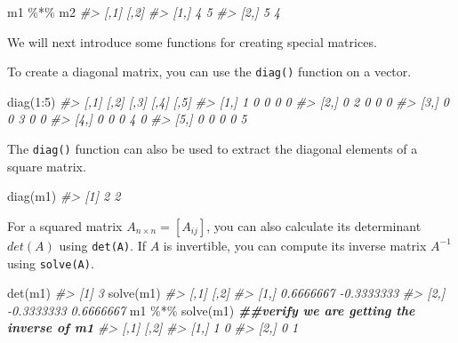 \documentclass[
]{book}
\newenvironment{Shaded}{\begin{snugshade}}{\end{snugshade}}
\newcommand{\CommentTok}[1]{\textcolor[rgb]{0.56,0.35,0.01}{\textit{#1}}}
\newcommand{\DecValTok}[1]{\textcolor[rgb]{0.00,0.00,0.81}{#1}}
\newcommand{\DocumentationTok}[1]{\textcolor[rgb]{0.56,0.35,0.01}{\textbf{\textit{#1}}}}
\newcommand{\FunctionTok}[1]{\textcolor[rgb]{0.00,0.00,0.00}{#1}}
\newcommand{\NormalTok}[1]{#1}
\newcommand{\SpecialCharTok}[1]{\textcolor[rgb]{0.00,0.00,0.00}{#1}}
\begin{document}
\begin{Shaded}
\begin{Highlighting}[]
\NormalTok{m1 }\SpecialCharTok{\%*\%}\NormalTok{ m2}
\CommentTok{\#\textgreater{}      [,1] [,2]}
\CommentTok{\#\textgreater{} [1,]    4    5}
\CommentTok{\#\textgreater{} [2,]    5    4}
\end{Highlighting}
\end{Shaded}

We will next introduce some functions for creating special matrices.

To create a diagonal matrix, you can use the \texttt{diag()} function on a vector.

\begin{Shaded}
\begin{Highlighting}[]
\FunctionTok{diag}\NormalTok{(}\DecValTok{1}\SpecialCharTok{:}\DecValTok{5}\NormalTok{)}
\CommentTok{\#\textgreater{}      [,1] [,2] [,3] [,4] [,5]}
\CommentTok{\#\textgreater{} [1,]    1    0    0    0    0}
\CommentTok{\#\textgreater{} [2,]    0    2    0    0    0}
\CommentTok{\#\textgreater{} [3,]    0    0    3    0    0}
\CommentTok{\#\textgreater{} [4,]    0    0    0    4    0}
\CommentTok{\#\textgreater{} [5,]    0    0    0    0    5}
\end{Highlighting}
\end{Shaded}

The \texttt{diag()} function can also be used to extract the diagonal elements of a square matrix.

\begin{Shaded}
\begin{Highlighting}[]
\FunctionTok{diag}\NormalTok{(m1)}
\CommentTok{\#\textgreater{} [1] 2 2}
\end{Highlighting}
\end{Shaded}

For a squared matrix \(A_{n\times n} = [A_{ij}]\), you can also calculate its determinant \(det(A)\) using \texttt{det(A)}. If \(A\) is invertible, you can compute its inverse matrix \(A^{-1}\) using \texttt{solve(A)}.

\begin{Shaded}
\begin{Highlighting}[]
\FunctionTok{det}\NormalTok{(m1)}
\CommentTok{\#\textgreater{} [1] 3}
\FunctionTok{solve}\NormalTok{(m1)}
\CommentTok{\#\textgreater{}            [,1]       [,2]}
\CommentTok{\#\textgreater{} [1,]  0.6666667 {-}0.3333333}
\CommentTok{\#\textgreater{} [2,] {-}0.3333333  0.6666667}
\NormalTok{m1 }\SpecialCharTok{\%*\%} \FunctionTok{solve}\NormalTok{(m1)   }\DocumentationTok{\#\#verify we are getting the inverse of m1}
\CommentTok{\#\textgreater{}      [,1] [,2]}
\CommentTok{\#\textgreater{} [1,]    1    0}
\CommentTok{\#\textgreater{} [2,]    0    1}
\end{Highlighting}
\end{Shaded}
\end{document}
